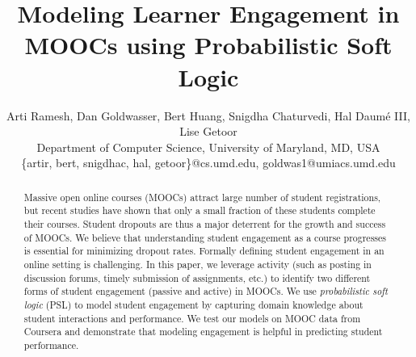 \documentclass{article} %
\title{Modeling Learner Engagement in MOOCs \newline
using Probabilistic Soft Logic}
\author{Arti Ramesh, Dan Goldwasser, Bert Huang, Snigdha Chaturvedi, Hal Daum\'e III, Lise Getoor\\ Department of Computer Science, University of Maryland, MD, USA\\
{\{artir, bert, snigdhac, hal, getoor\}@cs.umd.edu, goldwas1@umiacs.umd.edu}
}
\begin{document}
\maketitle

\begin{abstract}
Massive open online courses (MOOCs)   attract  large number of student registrations,  but recent studies have shown that only a small fraction of these students complete their courses. Student dropouts are thus a major deterrent for the growth and success of MOOCs. We believe that understanding student engagement as a course progresses is essential for minimizing dropout rates.  Formally defining student engagement in an online setting is challenging.  In this paper,  we leverage   activity (such as posting in discussion forums, timely submission of assignments, etc.)  to identify two different forms of student engagement (passive and active) in MOOCs. We use \emph{probabilistic soft logic} (PSL) to model student engagement by capturing domain knowledge about student interactions and performance.  We test our models on MOOC data from Coursera and demonstrate that modeling engagement is helpful in predicting student performance.

\end{abstract}









\end{document}
